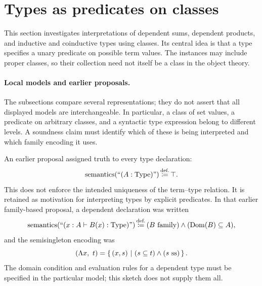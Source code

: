 \def\topic{Types as predicates on classes}

\section{Types as predicates on classes}


This section investigates interpretations of dependent sums, dependent
products, and inductive and coinductive types using classes. Its central
idea is that a type specifies a unary predicate on possible term values.
The instances may include proper classes, so their collection need not
itself be a class in the object theory.

\paragraph{Local models and earlier proposals.}
The subsections compare several representations; they do not assert that
all displayed models are interchangeable. In particular, a class of set
values, a predicate on arbitrary classes, and a syntactic type expression
belong to different levels. A soundness claim must identify which of these
is being interpreted and which family encoding it uses.

\begin{note}
An earlier proposal assigned truth to every type declaration:
\[
\mathrm{semantics}(``(A:\mathrm{Type})")\,{\stackrel{{\textrm{def.}}}{\coloneqq}}\,\top.
\]
This does not enforce the intended uniqueness of the term--type relation.
It is retained as motivation for interpreting types by explicit predicates.
In that earlier family-based proposal, a dependent declaration was written
\[
\mathrm{semantics}(``(x:A\vdash B(x):\mathrm{Type})")
\,{\stackrel{{\textrm{def.}}}{\coloneqq}}\, (B\mathrm{\ family})\land(\mathrm{Dom}(B)\subseteq A),
\]
and the semisingleton encoding was
\[
(\Lambda x,\ t)=\cc{(x,s)}{(s\subseteq t)\land(s\ \mbox{ss})}.
\]
The domain condition and evaluation rules for a dependent type must be
specified in the particular model; this sketch does not supply them all.
\end{note}

